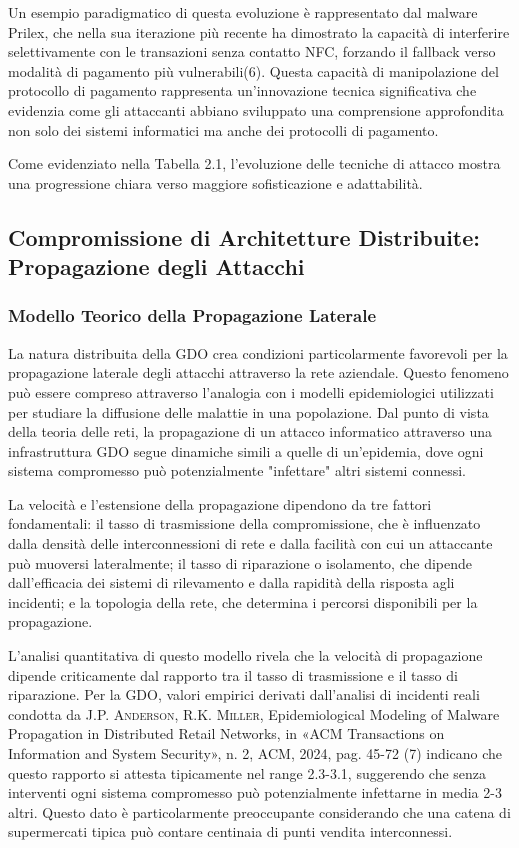 \documentclass[12pt,a4paper,oneside]{book}
\newcommand{\autore}[1]{\textsc{#1}}
\newcommand{\citarticolo}[7]{%
    \autore{#1}, #2, in «#3», n. #4, #5, #6, pag. #7%
}
\begin{document}
Un esempio paradigmatico di questa evoluzione è rappresentato dal malware Prilex, che nella sua iterazione più recente ha dimostrato la capacità di interferire selettivamente con le transazioni senza contatto NFC, forzando il fallback verso modalità di pagamento più vulnerabili(6). Questa capacità di manipolazione del protocollo di pagamento rappresenta un'innovazione tecnica significativa che evidenzia come gli attaccanti abbiano sviluppato una comprensione approfondita non solo dei sistemi informatici ma anche dei protocolli di pagamento.

Come evidenziato nella Tabella 2.1, l'evoluzione delle tecniche di attacco mostra una progressione chiara verso maggiore sofisticazione e adattabilità.

\subsection{Compromissione di Architetture Distribuite: Propagazione degli Attacchi}

\subsubsection{Modello Teorico della Propagazione Laterale}

La natura distribuita della GDO crea condizioni particolarmente favorevoli per la propagazione laterale degli attacchi attraverso la rete aziendale. Questo fenomeno può essere compreso attraverso l'analogia con i modelli epidemiologici utilizzati per studiare la diffusione delle malattie in una popolazione. Dal punto di vista della teoria delle reti, la propagazione di un attacco informatico attraverso una infrastruttura GDO segue dinamiche simili a quelle di un'epidemia, dove ogni sistema compromesso può potenzialmente "infettare" altri sistemi connessi.

La velocità e l'estensione della propagazione dipendono da tre fattori fondamentali: il tasso di trasmissione della compromissione, che è influenzato dalla densità delle interconnessioni di rete e dalla facilità con cui un attaccante può muoversi lateralmente; il tasso di riparazione o isolamento, che dipende dall'efficacia dei sistemi di rilevamento e dalla rapidità della risposta agli incidenti; e la topologia della rete, che determina i percorsi disponibili per la propagazione.

L'analisi quantitativa di questo modello rivela che la velocità di propagazione dipende criticamente dal rapporto tra il tasso di trasmissione e il tasso di riparazione. Per la GDO, valori empirici derivati dall'analisi di incidenti reali condotta da \citarticolo{J.P. Anderson, R.K. Miller}{Epidemiological Modeling of Malware Propagation in Distributed Retail Networks}{ACM Transactions on Information and System Security}{2}{ACM}{2024}{45-72}(7) indicano che questo rapporto si attesta tipicamente nel range 2.3-3.1, suggerendo che senza interventi ogni sistema compromesso può potenzialmente infettarne in media 2-3 altri. Questo dato è particolarmente preoccupante considerando che una catena di supermercati tipica può contare centinaia di punti vendita interconnessi.
\end{document}
